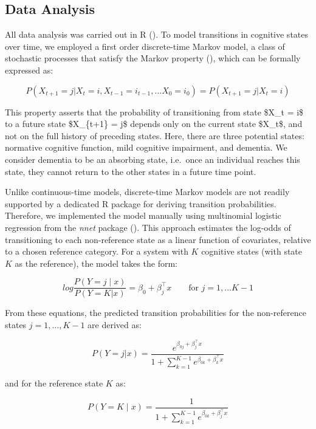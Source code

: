 \documentclass[
]{article}
\begin{document}
\clearpage

\subsection{Data Analysis}\label{data-analysis}

All data analysis was carried out in R (). To model transitions in cognitive states over time,
we employed a first order discrete-time Markov model, a class of
stochastic processes that satisfy the Markov property
(), which can be
formally expressed as:

\[P(X_{t+1} = j \vert X_t = i, X_{t-1} = i_{t-1}, \dots X_0 = i_0) = P(X_{t+1} = j \vert X_t = i)\]

This property asserts that the probability of transitioning from state
\$X\_t = i\$ to a future state \$X\_\{t+1\} = j\$ depends only on the
current state \$X\_t\$, and not on the full history of preceding states.
Here, there are three potential states: normative cognitive function,
mild cognitive impairment, and dementia. We consider dementia to be an
absorbing state, i.e.~once an individual reaches this state, they cannot
return to the other states in a future time point.

Unlike continuous-time models, discrete-time Markov models are not
readily supported by a dedicated R package for deriving transition
probabilities. Therefore, we implemented the model manually using
multinomial logistic regression from the \emph{nnet} package
(). This approach
estimates the log-odds of transitioning to each non-reference state as a
linear function of covariates, relative to a chosen reference category.
For a system with \(K\) cognitive states (with state \(K\) as the
reference), the model takes the form:

\[log \frac{P(Y = j \; \vert \; x)}{P(Y = K \vert x)} = \beta_0 + \beta_j^\top x \qquad \text{for } j = 1, \dots K-1\]

From these equations, the predicted transition probabilities for the
non-reference states \(j = 1, \dots, K - 1\) are derived as:

\[P(Y = j \vert x) = \frac{e^{\beta_{0j} + \beta_j^\top x}}{1 + \sum^{K - 1}_{k = 1} e^{\beta_{0k} + \beta_k^ \top x}}\]

and for the reference state \(K\) as:

\[ P(Y = K \; \vert \; x) = \frac{1}{1 + \sum^{K - 1}_{k = 1} e^{\beta_{0k} + \beta_j^ \top x }} \]
\end{document}
